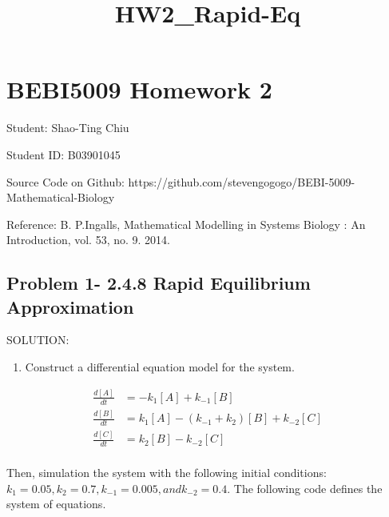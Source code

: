 \documentclass[11pt]{article}
\title{HW2\_Rapid-Eq}
\providecommand{\tightlist}{%
      \setlength{\itemsep}{0pt}\setlength{\parskip}{0pt}}
\begin{document}
    
    
    \maketitle
    
    

    
    \section{BEBI5009 Homework 2}\label{bebi5009-homework-2}

Student: Shao-Ting Chiu

Student ID: B03901045

Source Code on Github:
https://github.com/stevengogogo/BEBI-5009-Mathematical-Biology

Reference: B. P.Ingalls, Mathematical Modelling in Systems Biology : An
Introduction, vol. 53, no. 9. 2014.

    \subsection{Problem 1- 2.4.8 Rapid Equilibrium
Approximation}\label{problem-1--2.4.8-rapid-equilibrium-approximation}

    SOLUTION:

    \begin{enumerate}
\def\labelenumi{(\alph{enumi})}
\tightlist
\item
  Construct a differential equation model for the system.
\end{enumerate}

\[\begin{align}
\frac{d[A]}{dt} &= -k_{1}[A] + k_{-1}[B]\\
\frac{d[B]}{dt} &= k_{1}[A] - (k_{-1}+k_{2})[B] + k_{-2}[C] \\
\frac{d[C]}{dt} &= k_{2}[B] - k_{-2}[C]\\
\end{align}\]

Then, simulation the system with the following initial conditions:
\(k_{1}=0.05, k_{2}=0.7, k_{-1}=0.005, and k_{-2}=0.4\). The following
code defines the system of equations.
\end{document}
